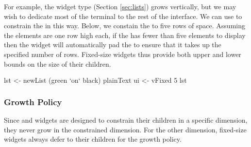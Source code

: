 For example, the  widget type (Section \ref{sec:lists}) grows
vertically, but we may wish to dedicate most of the terminal to the
rest of the interface.  We can use  to constrain the
 in this way.  Below, we constain the  to five rows
of space.  Assuming the  elements are one row high each, if
the  has fewer than five elements to display then the
 widget will automatically pad the  to ensure that
it takes up the specified number of rows.  Fixed-size widgets thus
provide both upper and lower bounds on the size of their children.

\begin{haskellcode}
 lst <- newList (green `on` black) plainText
 ui <- vFixed 5 lst
\end{haskellcode}

\subsubsection{Growth Policy}

Since  and  widgets are designed to constrain
their children in a specific dimension, they never grow in the
constrained dimension.  For the other dimension, fixed-size widgets
always defer to their children for the growth policy.
